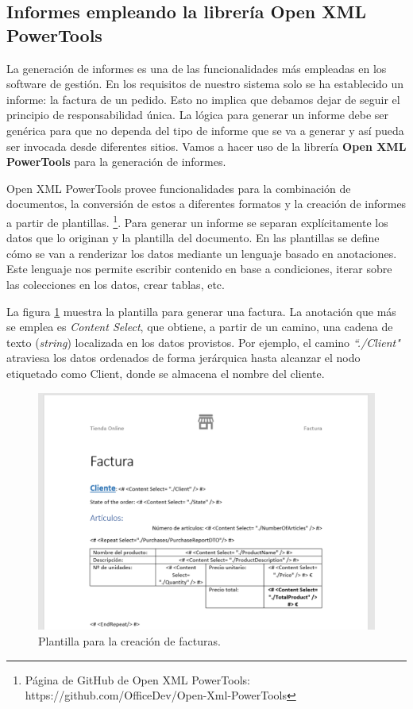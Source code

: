 \documentclass[11pt,spanish,listoffigures]{tfgetsinf}
\begin{document}
\subsection{Informes empleando la librería Open XML PowerTools}

La generación de informes es una de las funcionalidades más empleadas en los software de gestión. En los requisitos de nuestro sistema solo se ha establecido un informe: la factura de un pedido. Esto no implica que debamos dejar de seguir el principio de responsabilidad única. La lógica para generar un informe debe ser genérica para que no dependa del tipo de informe que se va a generar y así pueda ser invocada desde diferentes sitios. Vamos a hacer uso de la librería \textbf{Open XML PowerTools} para la generación de informes.

Open XML PowerTools provee funcionalidades para la combinación de documentos, la conversión de estos a diferentes formatos y la creación de informes a partir de plantillas. \footnote{ Página de GitHub de Open XML PowerTools: https://github.com/OfficeDev/Open-Xml-PowerTools}. Para generar un informe se separan explícitamente los datos que lo originan y la plantilla del documento. En las plantillas se define cómo se van a renderizar los datos mediante un lenguaje basado en anotaciones. Este lenguaje nos permite escribir contenido en base a condiciones, iterar sobre las colecciones en los datos, crear tablas, etc.

La figura \ref{fig:Factura} muestra la plantilla para generar una factura. La anotación que más se emplea es \textit{Content Select}, que obtiene, a partir de un camino, una cadena de texto (\textit{string}) localizada en los datos provistos. Por ejemplo, el camino \textit{``./Client"} atraviesa los datos ordenados de forma jerárquica hasta alcanzar el nodo etiquetado como Client, donde se almacena el nombre del cliente.

\begin{figure}[h]
\centering
\includegraphics[scale=0.5]{Factura}
\caption{Plantilla para la creación de facturas.}
\label{fig:Factura}
\end{figure}
\end{document}
